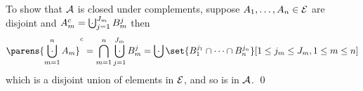 To show that ${\cal A}$ is closed under complements, suppose $A_1,\dots,A_n\in{\cal E}$ are disjoint and $A_m^c=\bigdcup_{j=1}^{J_m}B_m^j$ then
$$ \parens{\bigdcup_{m=1}^nA_m}^c = \bigcap_{m=1}^n\bigdcup_{j=1}^{J_m}B^j_m = \bigdcup\set{B_1^{j_1}\cap\cdots\cap B_n^{j_n}}[1\leq j_m\leq J_m,1\leq m\leq n] $$
which is a disjoint union of elements in ${\cal E}$, and so is in ${\cal A}$.
\qed

